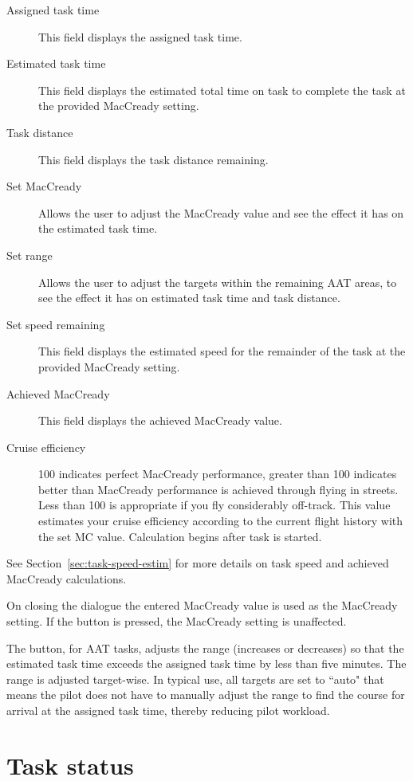 \begin{description}
\item[Assigned task time]  This field displays the assigned task time.
\item[Estimated task time]  This field displays the estimated total time 
  on task to complete the task at the provided MacCready setting.
\item[Task distance]  This field displays the task distance remaining.
\item[Set MacCready]  Allows the user to adjust the MacCready value and 
  see the effect it has on the estimated task time.
\item[Set range]  Allows the user to adjust the targets within the remaining 
  AAT areas, to see the effect it has on estimated task time and task distance.
\item[Set speed remaining]  This field displays the estimated speed for the
  remainder of the task at the provided MacCready setting.
\item[Achieved MacCready]  This field displays the achieved MacCready value.
\item[Cruise efficiency]  100 indicates perfect MacCready performance, greater 
than 100 indicates better than MacCready performance is achieved through flying
in streets. Less than 100 is appropriate if you fly considerably off-track. This 
value estimates your cruise efficiency according to the current flight history 
with the set MC value. Calculation begins after task is started.
\end{description}
See Section~\ref{sec:task-speed-estim} for more details on task speed
and achieved MacCready calculations.

On closing the dialogue the entered MacCready value is used as the MacCready 
setting. If the  button is pressed, the MacCready setting is 
unaffected.

The  button, for AAT tasks, adjusts the range
(increases or decreases) so that the estimated task time exceeds the
assigned task time by less than five minutes.  The range is adjusted
target-wise. In typical use, all targets are set to ``auto" that means the pilot 
does not have to manually adjust the range to find the course for arrival at 
the assigned task time, thereby reducing pilot workload.


\section{Task status}\label{sec:task-status}


